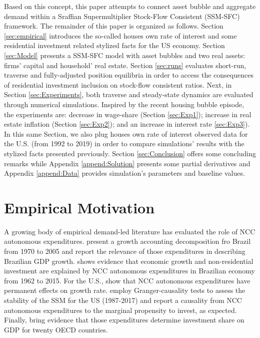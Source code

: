 \documentclass[11pt]{article}
\begin{document}
Based on this concept, this paper attempts to connect asset bubble and aggregate demand within a Sraffian Supermultiplier Stock-Flow Consistent (SSM-SFC) framework. 
The remainder of this paper is organized as follows.
Section \ref{sec:empirical} introduces the so-called houses own rate of interest and some residential investment related stylized facts for the US economy.
Section \ref{sec:Model} presents a SSM-SFC model  with asset bubbles and two real assets: firms' capital and household' real estate. 
Section \ref{sec:runs} evaluates short-run, traverse and fully-adjusted position equilibria in order to access the consequences of residential investment inclusion on stock-flow consistent ratios.
Next, in Section \ref{sec:Experiments}, both traverse and steady-state dynamics are evaluated through numerical simulations.
Inspired by the recent housing bubble episode, the experiments are: decrease in wage-share (Section \ref{sec:Exp1}); increase in real estate inflation (Section \ref{sec:Exp2}); and an increase in interest rate \ref{sec:Exp3}).
In this same Section, we also plug houses own rate of interest observed data for the U.S. (from 1992 to 2019) in order to compare simulations' results with the stylized facts presented previously.
Section \ref{sec:Conclusion} offers some concluding remarks while Appendix \ref{append:Solution} presents some partial derivatives and Appendix \ref{append:Data} provides simulation's parameters and baseline values.



\section{Empirical Motivation}
\label{sec:org93cdd16}
\label{sec:empirical}
A growing body of empirical demand-led literature has evaluated the role of NCC autonomous expenditures.
\textcite{freitas_pattern_2013} present a growth accounting decomposition fro Brazil from 1970 to 2005 and report the relevance of those expenditures in describing Brazilian GDP growth. \textcite{braga_investment_2018} shows evidence that economic growth and non-residential investment are explained by NCC autonomous expenditures in Brazilian economy from 1962 to 2015. For the U.S., \textcite{girardi_long-run_2016} show that NCC autonomous expenditures have permanent effects on growth rate. 
\textcite{haluska_growth_2019} employ Granger-causality tests to assess the stability of the SSM for the US (1987-2017) and report a causality from NCC autonomous expenditures to the marginal propensity to invest, as expected.
Finally, \textcite{girardi_autonomous_2018} bring evidence that those expenditures determine investment share on GDP for twenty OECD countries.
\end{document}
